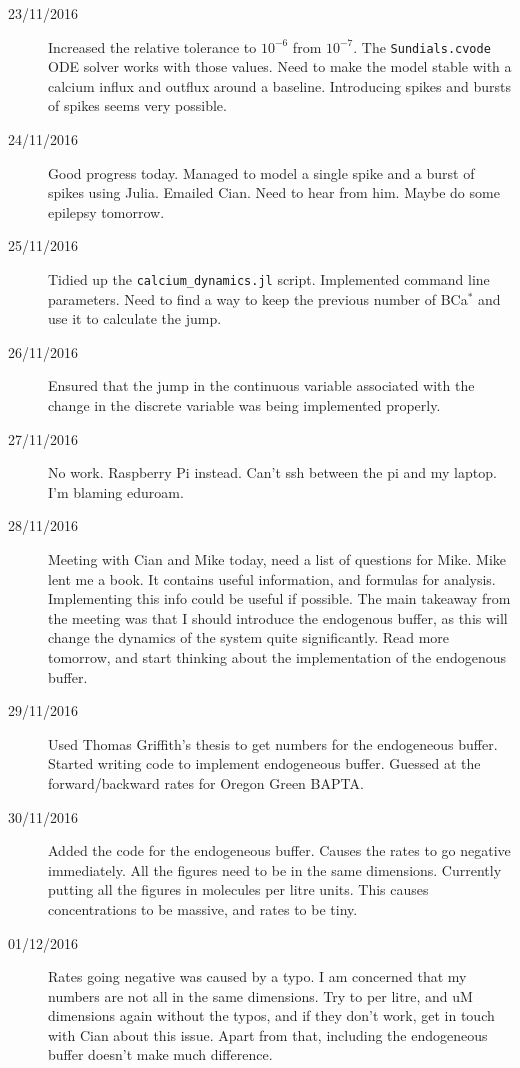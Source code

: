 \documentclass[a4paper,12pt]{article}
\theoremstyle{definition}
\begin{document}
\begin{description}
	\item[23/11/2016] Increased the relative tolerance to $10^{-6}$ from $10^{-7}$. The \texttt{Sundials.cvode} ODE solver works with those values. Need to make the model stable with a calcium influx and outflux around a baseline. Introducing spikes and bursts of spikes seems very possible.

	\item[24/11/2016] Good progress today. Managed to model a single spike and a burst of spikes using Julia. Emailed Cian. Need to hear from him. Maybe do some epilepsy tomorrow.

	\item[25/11/2016] Tidied up the \texttt{calcium\_dynamics.jl} script. Implemented command line parameters. Need to find a way to keep the previous number of BCa$^*$ and use it to calculate the jump.

	\item[26/11/2016] Ensured that the jump in the continuous variable  associated with the change in the discrete variable was being implemented properly.

	\item[27/11/2016] No work. Raspberry Pi instead. Can't ssh between the pi and my laptop. I'm blaming eduroam.

	\item[28/11/2016] Meeting with Cian and Mike today, need a list of questions for Mike. Mike lent me a book. It contains useful information, and formulas for analysis. Implementing this info could be useful if possible. The main takeaway from the meeting was that I should introduce the endogenous buffer, as this will change the dynamics of the system quite significantly. Read more tomorrow, and start thinking about the implementation of the endogenous buffer.

	\item[29/11/2016] Used Thomas Griffith's thesis to get numbers for the endogeneous buffer. Started writing code to implement endogeneous buffer. Guessed at the \\ forward/backward rates for Oregon Green BAPTA.

	\item[30/11/2016] Added the code for the endogeneous buffer. Causes the rates to go negative immediately. All the figures need to be in the same dimensions. Currently putting all the figures in molecules per litre units. This causes concentrations to be massive, and rates to be tiny.

	\item[01/12/2016] Rates going negative was caused by a typo. I am concerned that my numbers are not all in the same dimensions. Try to per litre, and uM dimensions again without the typos, and if they don't work, get in touch with Cian about this issue. Apart from that, including the endogeneous buffer doesn't make much difference.


\end{description}
\end{document}
